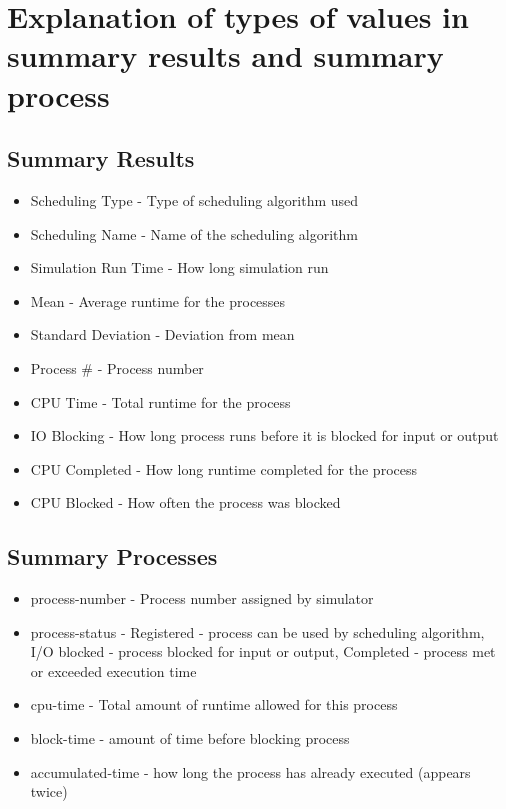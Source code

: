\section{Explanation of types of values in summary results and summary
process} 
\subsection{Summary Results} 
\begin{itemize}
	\item Scheduling Type - Type of scheduling algorithm used
	\item Scheduling Name - Name of the scheduling algorithm
	\item Simulation Run Time - How long simulation run
	\item Mean - Average runtime for the processes
	\item Standard Deviation - Deviation from mean
	\item Process \#    - Process number
	\item CPU Time      - Total runtime for the process
	\item IO Blocking   - How long process runs before it is blocked for
		input or output
	\item CPU Completed - How long runtime completed for the process
	\item CPU Blocked   - How often the process was blocked
\end{itemize}
\cite{lab3 Manual}
\subsection{Summary Processes} 
\begin{itemize}
	\item process-number - Process number assigned by simulator
	\item process-status - Registered - process can be used by scheduling
		algorithm, I/O blocked - process blocked for input or output,
		Completed - process met or exceeded execution time
	\item cpu-time - Total amount of runtime allowed for this process
	\item block-time - amount of time before blocking process
	\item accumulated-time - how long the process has already executed
		(appears twice)
\end{itemize}
\cite{lab3 Manual}


